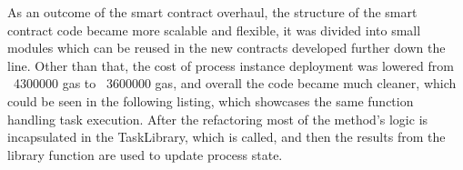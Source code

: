 As an outcome of the smart contract overhaul, the structure of the smart contract code became more scalable and flexible, it was divided into small modules which can be reused in the new contracts developed further down the line.
Other than that, the cost of process instance deployment was lowered from ~4300000 gas to ~3600000 gas, and overall the code became much cleaner, which could be seen in the following listing, which showcases the same function handling task execution. After the refactoring most of the method's logic is incapsulated in the TaskLibrary, which is called, and then the results from the library function are used to update process state.

 


